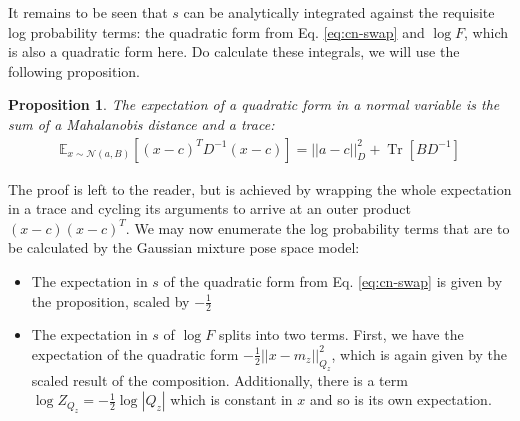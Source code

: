 \documentclass{article}         %
\newtheorem{proposition}{Proposition}[section]
\newcommand{\inv}{^{-1}}
\newcommand{\EE}{\mathbb{E}}
\newcommand{\NN}{\mathcal{N}}
\newcommand{\abs}[1]{\left| #1 \right|}
\newcommand{\norm}[1]{\left|\left| #1 \right|\right|}
\newcommand{\pn}[1]{\left( #1 \right)}
\newcommand{\bc}[1]{\left[ #1 \right]}
\DeclareMathOperator{\Tr}{Tr}
\begin{document}

It remains to be seen that $s$ can be analytically integrated against the requisite log probability terms: the quadratic form from Eq. \ref{eq:cn-swap} and $\log F$, which is also a quadratic form here. Do calculate these integrals, we will use the following proposition.
\begin{proposition}
\label{prop:norm-quad-expect-2}
The expectation of a quadratic form in a normal variable is the sum of a Mahalanobis distance and a trace:
\begin{align}
    \EE_{x\sim\NN(a, B)} \bc{(x - c)^T D\inv (x - c)} = \norm{a - c}^2_D + \Tr\bc{BD\inv}
\end{align}
\end{proposition}
The proof is left to the reader, but is achieved by wrapping the whole expectation in a trace and cycling its arguments to arrive at an outer product $(x - c)(x - c)^T$. We may now enumerate the log probability terms that are to be calculated by the Gaussian mixture pose space model:
\begin{itemize}
    \item The expectation in $s$ of the quadratic form from Eq. \ref{eq:cn-swap} is given by the proposition, scaled by $-\frac{1}{2}$
    \item The expectation in $s$ of $\log F$ splits into two terms. First, we have the expectation of the quadratic form $-\frac{1}{2}\norm{x - m_z}^2_{Q_z}$, which is again given by the scaled result of the composition. Additionally, there is a term $\log Z_{Q_z} = -\frac{1}{2}\log\abs{Q_z}$ which is constant in $x$ and so is its own expectation.
\end{itemize}
\end{document}
